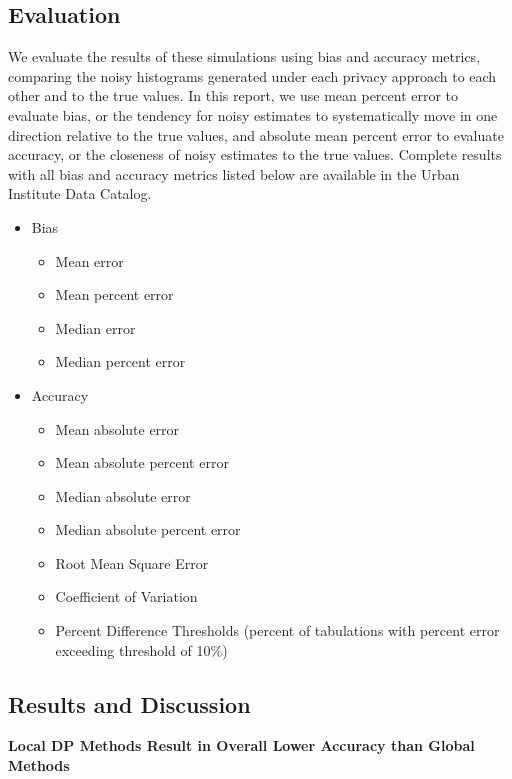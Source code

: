 \documentclass[
]{urban-formatting}
\providecommand{\tightlist}{%
  \setlength{\itemsep}{0pt}\setlength{\parskip}{0pt}}\usepackage{longtable,booktabs,array}
\begin{document}
\subsection{Evaluation}

We evaluate the results of these simulations using bias and accuracy
metrics, comparing the noisy histograms generated under each privacy
approach to each other and to the true values. In this report, we use
mean percent error to evaluate bias, or the tendency for noisy estimates
to systematically move in one direction relative to the true values, and
absolute mean percent error to evaluate accuracy, or the closeness of
noisy estimates to the true values. Complete results with all bias and
accuracy metrics listed below are available in the Urban Institute Data
Catalog.

\begin{itemize}
\tightlist
\item
  Bias

  \begin{itemize}
  \tightlist
  \item
    Mean error
  \item
    Mean percent error
  \item
    Median error
  \item
    Median percent error
  \end{itemize}
\item
  Accuracy

  \begin{itemize}
  \tightlist
  \item
    Mean absolute error
  \item
    Mean absolute percent error
  \item
    Median absolute error
  \item
    Median absolute percent error
  \item
    Root Mean Square Error
  \item
    Coefficient of Variation
  \item
    Percent Difference Thresholds (percent of tabulations with percent
    error exceeding threshold of 10\%)
  \end{itemize}
\end{itemize}

\subsection{Results and Discussion}

\textbf{Local DP Methods Result in Overall Lower Accuracy than Global
Methods}
\end{document}
